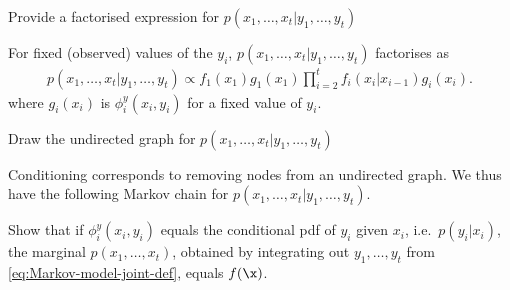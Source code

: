 \begin{exenumerate}
  
\item Provide a factorised expression for $ p(x_1, \ldots, x_t | y_1, \ldots, y_t)$

  \begin{solution}
    For fixed (observed) values of the $y_i$, $p(x_1, \ldots, x_t |
    y_1, \ldots, y_t)$ factorises as
    \begin{align}
      p(x_1, \ldots, x_t | y_1, \ldots, y_t) \propto f_1(x_1) g_1(x_1)
      \prod_{i=2}^t f_i(x_i|x_{i-1}) g_i(x_i).
    \end{align}
    where $g_i(x_i)$ is $\phi^y_i(x_i,y_i)$ for a fixed value of $y_i$. 
  \end{solution}

\item Draw the undirected graph for $p(x_1, \ldots, x_t | y_1, \ldots, y_t)$
  \begin{solution}
    Conditioning corresponds to removing nodes from an undirected
    graph. We thus have the following Markov chain for $p(x_1, \ldots,
    x_t | y_1, \ldots, y_t)$.

\begin{center}
\end{center}
   
 \end{solution}

\item Show that if $\phi_i^y(x_i, y_i)$ equals the conditional pdf of
  $y_i$ given $x_i$, i.e.\ $p(y_i|x_i)$, the marginal $p(x_1, \ldots, x_t)$,
  obtained by integrating out $y_1, \ldots, y_t$ from
  \eqref{eq:Markov-model-joint-def}, equals $f(\x)$.


\end{exenumerate}
